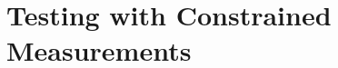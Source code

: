 \documentclass[biber]{nowfnt} %
\begin{document}
\chapter{Testing with Constrained Measurements}
  \label{chap:constrained}


%
%
%
%
\end{document}
